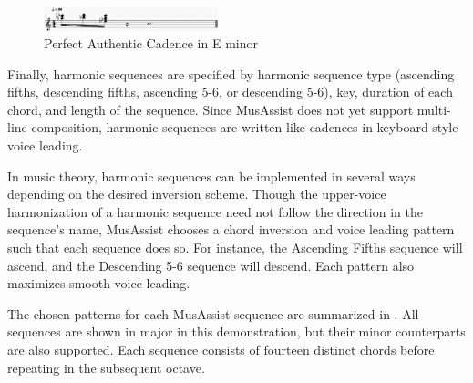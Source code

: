 \documentclass{article}
\begin{document}
\begin{figure}[h!]
\centering
\includegraphics[width=0.45\textwidth]{images/perfauth}
  \caption{Perfect Authentic Cadence in E\musFlat\; minor \label{fig:perfauth}}
  \vspace{-3mm}
\end{figure}

Finally, harmonic sequences are specified by harmonic sequence type (ascending fifths, descending fifths, ascending 5-6, or descending 5-6), key, duration of each chord, and length of the sequence. Since MusAssist does not yet support multi-line composition, harmonic sequences are written like cadences in keyboard-style voice leading.

In music theory, harmonic sequences can be implemented in several ways depending on the desired inversion scheme. Though the upper-voice harmonization of a harmonic sequence need not follow the direction in the sequence’s name, MusAssist chooses a chord inversion and voice leading pattern such that each sequence does so. For instance, the Ascending Fifths sequence will ascend, and the Descending 5-6 sequence will descend. Each pattern also maximizes smooth voice leading. 

The chosen patterns for each MusAssist sequence are summarized in  .
All sequences are shown in major in this demonstration, but their minor counterparts are also supported. Each sequence consists of fourteen distinct chords before repeating in the subsequent octave. 
\end{document}
